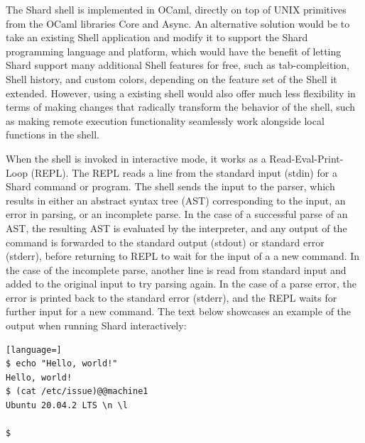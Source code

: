 \documentclass[twoside]{report}
\begin{document}

The Shard shell is implemented in OCaml, directly on top of UNIX primitives from the OCaml libraries Core and Async.
An alternative solution would be to take an existing Shell application and modify it to support the Shard programming language and platform, which would have the benefit of letting Shard support many additional Shell features for free, such as tab-compleition, Shell history, and custom colors, depending on the feature set of the Shell it extended.
However, using a existing shell would also offer much less flexibility in terms of making changes that radically transform the behavior of the shell, such as making remote execution functionality seamlessly work alongside local functions in the shell.

When the shell is invoked in interactive mode, it works as a Read-Eval-Print-Loop (REPL). The REPL reads a line from the standard input (stdin) for a Shard command or program. The shell sends the input to the parser, which results in either an abstract syntax tree (AST) corresponding to the input, an error in parsing, or an incomplete parse.
In the case of a successful parse of an AST, the resulting AST is evaluated by the interpreter, and any output of the command is forwarded to the standard output (stdout) or standard error (stderr), before returning to REPL to wait for the input of a a new command.
In the case of the incomplete parse, another line is read from standard input and added to the original input to try parsing again.
In the case of a parse error, the error is printed back to the standard error (stderr), and the REPL waits for further input for a new command.
The text below showcases an example of the output when running Shard interactively:

\begin{minipage}[c]{\textwidth-15pt}
  \begin{lstlisting}[language=]
$ echo "Hello, world!"
Hello, world!
$ (cat /etc/issue)@@machine1
Ubuntu 20.04.2 LTS \n \l

$
\end{lstlisting}
  \smallskip
\end{minipage}
\end{document}
